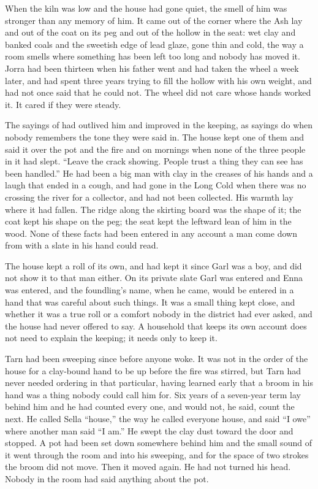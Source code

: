 When the kiln was low and the house had gone quiet, the smell of him was stronger than any memory of him. It came out of the corner where the Ash lay and out of the coat on its peg and out of the hollow in the seat: wet clay and banked coals and the sweetish edge of lead glaze, gone thin and cold, the way a room smells where something has been left too long and nobody has moved it. Jorra had been thirteen when his father went and had taken the wheel a week later, and had spent three years trying to fill the hollow with his own weight, and had not once said that he could not. The wheel did not care whose hands worked it. It cared if they were steady.

The sayings of  had outlived him and improved in the keeping, as sayings do when nobody remembers the tone they were said in. The house kept one of them and said it over the pot and the fire and on mornings when none of the three people in it had slept. “Leave the crack showing. People trust a thing they can see has been handled.” He had been a big man with clay in the creases of his hands and a laugh that ended in a cough, and had gone in the Long Cold when there was no crossing the river for a collector, and had not been collected. His warmth lay where it had fallen. The ridge along the skirting board was the shape of it; the coat kept his shape on the peg; the seat kept the leftward lean of him in the wood. None of these facts had been entered in any account a man come down from  with a slate in his hand could read.

The house kept a roll of its own, and had kept it since Garl was a boy, and did not show it to that man either. On its private slate Garl was entered and Enna was entered, and the foundling's name, when he came, would be entered in a hand that was careful about such things. It was a small thing kept close, and whether it was a true roll or a comfort nobody in the district had ever asked, and the house had never offered to say. A household that keeps its own account does not need to explain the keeping; it needs only to keep it.

Tarn had been sweeping since before anyone woke. It was not in the order of the house for a clay-bound hand to be up before the fire was stirred, but Tarn had never needed ordering in that particular, having learned early that a broom in his hand was a thing nobody could call him for. Six years of a seven-year term lay behind him and he had counted every one, and would not, he said, count the next. He called Sella “house,” the way he called everyone house, and said “I owe” where another man said “I am.” He swept the clay dust toward the door and stopped. A pot had been set down somewhere behind him and the small sound of it went through the room and into his sweeping, and for the space of two strokes the broom did not move. Then it moved again. He had not turned his head. Nobody in the room had said anything about the pot.

